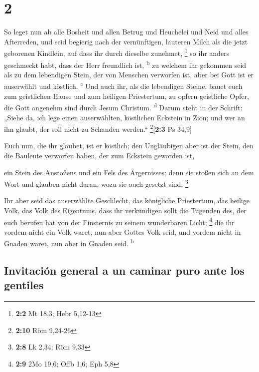 \hypertarget{section-1}{%
\section{2}\label{section-1}}

 So leget nun ab alle Bosheit und allen Betrug und
Heuchelei und Neid und alles Afterreden,  und seid
begierig nach der vernünftigen, lauteren Milch als die jetzt geborenen
Kindlein, auf dass ihr durch dieselbe zunehmet, \footnote{\textbf{2:2}
  Mt 18,3; Hebr 5,12-13}  so ihr anders geschmeckt habt,
dass der Herr freundlich ist, \textsuperscript{b}  zu
welchem ihr gekommen seid als zu dem lebendigen Stein, der von Menschen
verworfen ist, aber bei Gott ist er auserwählt und köstlich.
\textsuperscript{c}  Und auch ihr, als die lebendigen
Steine, bauet euch zum geistlichen Hause und zum heiligen Priestertum,
zu opfern geistliche Opfer, die Gott angenehm sind durch Jesum Christum.
\textsuperscript{d}  Darum steht in der Schrift: „Siehe
da, ich lege einen auserwählten, köstlichen Eckstein in Zion; und wer an
ihn glaubt, der soll nicht zu Schanden werden.``
\footnote{\textbf{2:10} Röm 9,24-26}{[}\textbf{2:3} Ps 34,9{]}

 Euch nun, die ihr glaubet, ist er köstlich; den
Ungläubigen aber ist der Stein, den die Bauleute verworfen haben, der
zum Eckstein geworden ist,

 ein Stein des Anstoßens und ein Fels des Ärgernisses;
denn sie stoßen sich an dem Wort und glauben nicht daran, wozu sie auch
gesetzt sind. \footnote{\textbf{2:8} Lk 2,34; Röm 9,33}

 Ihr aber seid das auserwählte Geschlecht, das königliche
Priestertum, das heilige Volk, das Volk des Eigentums, dass ihr
verkündigen sollt die Tugenden des, der euch berufen hat von der
Finsternis zu seinem wunderbaren Licht; \footnote{\textbf{2:9} 2Mo 19,6;
  Offb 1,6; Eph 5,8}  die ihr vordem nicht ein Volk
waret, nun aber Gottes Volk seid, und vordem nicht in Gnaden waret, nun
aber in Gnaden seid. \textsuperscript{b}

\hypertarget{invitaciuxf3n-general-a-un-caminar-puro-ante-los-gentiles}{%
\subsection{Invitación general a un caminar puro ante los
gentiles}\label{invitaciuxf3n-general-a-un-caminar-puro-ante-los-gentiles}}

